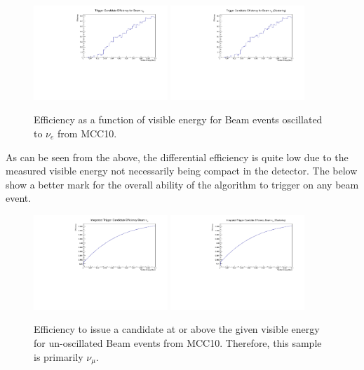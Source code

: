 \documentclass[10pt]{article}
\begin{document}
\begin{figure}[H]
    \centering
    \includegraphics[angle=270,width=0.45\textwidth]{UpdatedEff/Differential_Nu_e_Efficiency_MCC10.pdf}
    \includegraphics[angle=270,width=0.45\textwidth]{UpdatedEff/Differential_Nu_e_Efficiency_MCC10_CLUS.pdf}
    \caption{Efficiency as a function of visible energy for Beam events oscillated to $\nu_{e}$ from MCC10.}
    \label{fig:eff_beam_nue}
\end{figure}

As can be seen from the above, the differential efficiency is quite low due to the measured visible energy not necessarily being compact in the detector. The below show a better mark for the overall ability of the algorithm to trigger on any beam event.

\begin{figure}[H]
    \centering
    \includegraphics[angle=270,width=0.45\textwidth]{UpdatedEff/Integrated_Nu_mu_Efficiency_MCC10.pdf}
    \includegraphics[angle=270,width=0.45\textwidth]{UpdatedEff/Integrated_Nu_mu_Efficiency_MCC10_CLUS.pdf}
    \caption{Efficiency to issue a candidate at or above the given visible energy for un-oscillated Beam events from MCC10. Therefore, this sample is primarily $\nu_{\mu}$.}
    \label{fig:eff_beam_numu_int}
\end{figure}
\end{document}
